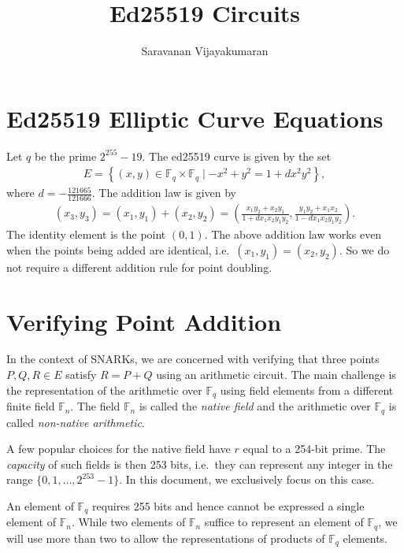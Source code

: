 \documentclass[a4paper, 12pt]{article}
\title{Ed25519 Circuits}
\author{Saravanan Vijayakumaran}
\begin{document}
\maketitle

\section{Ed25519 Elliptic Curve Equations}%
\label{sec:curve_equations}
Let $q$ be the prime $2^{255}-19$. The ed25519 curve is given by the set
\begin{align}
  E = \left\{ (x,y) \in \mathbb{F}_q \times \mathbb{F}_q \mid -x^2+y^2=1+dx^2y^2 \right\},
  \label{eqn:curve}
\end{align}
where $d = -\frac{121665}{121666}$. The addition law is given by
\begin{align}
  (x_3, y_3) = (x_1, y_1) + (x_2, y_2) = \left( \frac{x_1y_2+x_2y_1}{1+dx_1x_2y_1y_2}, \frac{y_1y_2 + x_1x_2}{1-dx_1x_2y_1y_2}  \right).
  \label{eqn:addition}
\end{align}
The identity element is the point $(0,1)$. The above addition law works even when the points being added are identical, i.e.~$(x_1, y_1) = (x_2, y_2)$. So we do not require a different addition rule for point doubling.

\section{Verifying Point Addition}%
\label{sec:verifying_point_addition}
In the context of SNARKs, we are concerned with verifying that three points $P, Q, R \in E$ satisfy $R= P+Q$ using an arithmetic circuit. The main challenge is the representation of the arithmetic over $\mathbb{F}_q$ using field elements from a different finite field $\mathbb{F}_n$. The field $\mathbb{F}_n$ is called the \textit{native field} and the arithmetic over $\mathbb{F}_q$ is called \textit{non-native arithmetic}.

A few popular choices for the native field have $r$ equal to a 254-bit prime. The \textit{capacity} of such fields is then 253 bits, i.e.~they can represent any integer in the range $\{0,1,\ldots,2^{253}-1\}$. In this document, we exclusively focus on this case.

An element of $\mathbb{F}_q$ requires 255 bits and hence cannot be expressed a single element of $\mathbb{F}_n$. While two elements of $\mathbb{F}_n$ suffice to represent an element of $\mathbb{F}_q$, we will use more than two to allow the representations of products of $\mathbb{F}_q$ elements.
\end{document}
